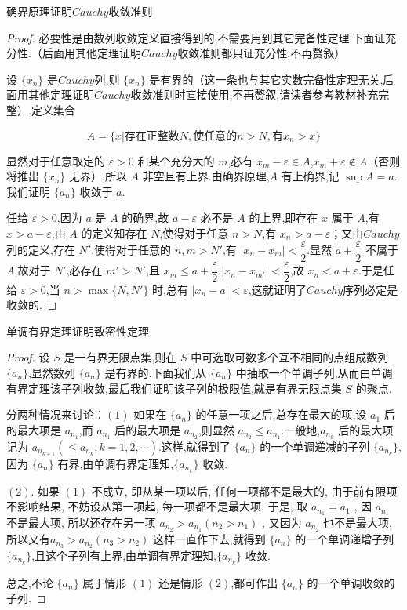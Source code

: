 \begin{proposition}
	确界原理证明$Cauchy$收敛准则
\end{proposition}
\begin{proof}
	必要性是由数列收敛定义直接得到的,不需要用到其它完备性定理.下面证充分性.（后面用其他定理证明$Cauchy$收敛准则都只证充分性,不再赘叙）
	
	设 $\{x_n\}$ 是$Cauchy$列,则 $\{x_n\}$ 是有界的（这一条也与其它实数完备性定理无关,后面用其他定理证明$Cauchy$收敛准则时直接使用,不再赘叙,请读者参考教材补充完整）.定义集合
	
	$$A = \{x | \text{存在正整数} N, \text{使任意的} n > N, \text{有} x_n > x\}  $$
	
	显然对于任意取定的 $\varepsilon > 0$ 和某个充分大的 $m$,必有 $x_m - \varepsilon \in A$,$x_m + \varepsilon \notin A$（否则将推出 $\{x_n\}$ 无界）,所以 $A$ 非空且有上界.由确界原理,$A$ 有上确界,记 $\sup A = a$.我们证明 $\{a_n\}$ 收敛于 $a$.
	
	任给 $\varepsilon > 0$,因为 $a$ 是 $A$ 的确界,故 $a - \varepsilon$ 必不是 $A$ 的上界,即存在 $x$ 属于 $A$,有 $x > a - \varepsilon$,由 $A$ 的定义知存在 $N$,使得对于任意 $n > N$,有 $x_n > a - \varepsilon$；又由$Cauchy$列的定义,存在 $N'$,使得对于任意的 $n, m > N'$,有 $|x_n - x_m| < \dfrac{\varepsilon}{2}$.显然 $a + \dfrac{\varepsilon}{2}$ 不属于 $A$,故对于 $N'$,必存在 $m' > N'$,且 $x_m \leqslant a + \dfrac{\varepsilon}{2}$,$|x_n - x_{m'}| < \dfrac{\varepsilon}{2}$,故 $x_n < a + \varepsilon$.于是任给 $\varepsilon > 0$,当 $n > \max\{N, N'\}$ 时,总有 $|x_n - a| < \varepsilon$,这就证明了$Cauchy$序列必定是收敛的.
\end{proof}
\begin{proposition}
	单调有界定理证明致密性定理
\end{proposition}
\begin{proof}
	
设 $S$ 是一有界无限点集,则在 $S$ 中可选取可数多个互不相同的点组成数列 $\{a_n\}$,显然数列 $\{a_n\}$ 是有界的.下面我们从 $\{a_n\}$ 中抽取一个单调子列,从而由单调有界定理该子列收敛,最后我们证明该子列的极限值,就是有界无限点集 $S$ 的聚点.

分两种情况来讨论：$(1)$ 如果在 $\{a_n\}$ 的任意一项之后,总存在最大的项,设 $a_1$ 后的最大项是 $a_{n_1}$,而 $a_{n_1}$ 后的最大项是 $a_{n_2}$,则显然 $a_{n_2} \leqslant a_{n_1}$.一般地,$a_{n_k}$ 后的最大项记为 $a_{n_{k+1}} (\leqslant a_{n_k}, k = 1, 2, \cdots)$.这样,就得到了 $\{a_n\}$ 的一个单调递减的子列 $\{a_{n_k}\}$,因为 $\{a_n\}$ 有界,由单调有界定理知,$\{a_{n_k}\}$ 收敛.

$(2)$. 如果 $(1)$ 不成立, 即从某一项以后, 任何一项都不是最大的, 由于前有限项不影响结果, 不妨设从第一项起, 每一项都不是最大项. 于是, 取 $a_{n_1} = a_1$ , 因 $a_{n_1}$ 不是最大项, 所以还存在另一项 $a_{n_2} > a_{n_1} (n_2 > n_1)$ , 又因为 $a_{n_2}$ 也不是最大项, 所以又有$a_{n_3} > a_{n_2} (n_3 > n_2)$ 这样一直作下去,就得到 $\{a_n\}$ 的一个单调递增子列 $\{a_{n_k}\}$,且这个子列有上界,由单调有界定理知,$\{a_{n_k}\}$ 收敛.

总之,不论 $\{a_n\}$ 属于情形 $(1)$ 还是情形 $(2)$,都可作出 $\{a_n\}$ 的一个单调收敛的子列.
\end{proof}




